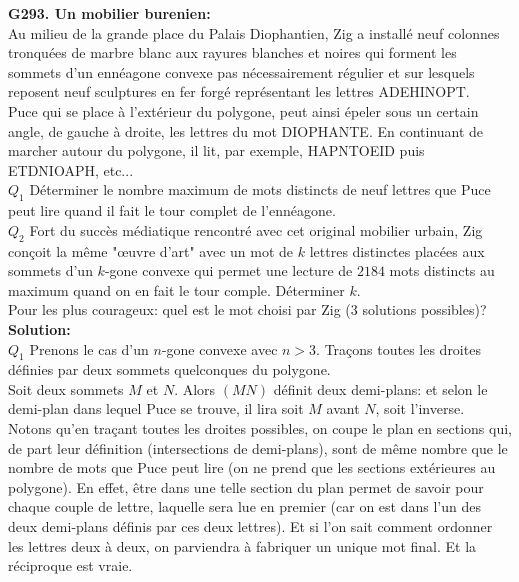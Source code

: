\documentclass[11pt] {article}
\begin{document}



\textbf{G293. Un mobilier burenien:}\\
Au milieu de la grande place du Palais Diophantien, Zig a installé neuf colonnes
tronquées de marbre blanc aux rayures blanches et noires qui forment les sommets
d'un ennéagone convexe pas nécessairement régulier et sur lesquels reposent neuf
sculptures en fer forgé représentant les lettres ADEHINOPT.\\
Puce qui se place à l'extérieur du polygone, peut ainsi épeler sous un certain
angle, de gauche à droite, les lettres du mot DIOPHANTE. En continuant de marcher
autour du polygone, il lit, par exemple, HAPNTOEID puis ETDNIOAPH, etc...\\
$Q_{1}$ Déterminer le nombre maximum de mots distincts de neuf lettres que Puce
peut lire quand il fait le tour complet de l'ennéagone.\\
$Q_{2}$ Fort du succès médiatique rencontré avec cet original mobilier urbain,
Zig conçoit la même "œuvre d'art" avec un mot de $k$ lettres distinctes placées
aux sommets d'un $k$-gone convexe qui permet une lecture de $2184$ mots distincts
au maximum quand on en fait le tour comple. Déterminer $k$.\\
Pour les plus courageux: quel est le mot choisi par Zig (3 solutions possibles)?\\

\textbf{Solution:}\\
$Q_{1}$ Prenons le cas d'un $n$-gone convexe avec $n > 3$. Traçons toutes les
droites définies par deux sommets quelconques du polygone.\\

Soit deux sommets $M$ et $N$. Alors $(MN)$ définit deux demi-plans: et selon le
demi-plan dans lequel Puce se trouve, il lira soit $M$ avant $N$, soit l'inverse.\\
Notons qu'en traçant toutes les droites possibles, on coupe le plan en sections
qui, de part leur définition (intersections de demi-plans), sont de même nombre
que le nombre de mots que Puce peut lire (on ne prend que les sections extérieures
au polygone). En effet, être dans une telle section
du plan permet de savoir pour chaque couple de lettre, laquelle sera lue en
premier (car on est dans l'un des deux demi-plans définis par ces deux lettres).
Et si l'on sait comment ordonner les lettres deux à deux, on parviendra à
fabriquer un unique mot final. Et la réciproque est vraie.\\
\end{document}
